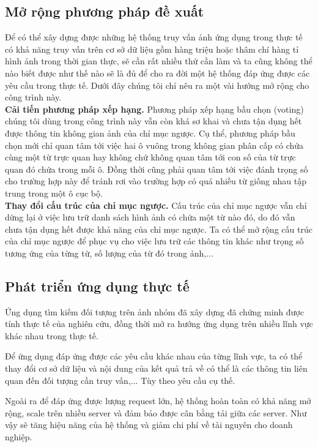 \subsection{Mở rộng phương pháp đề xuất}
Để có thể xây dựng được những hệ thống truy vấn ảnh ứng dụng trong thực tế có khả năng truy vấn trên cơ sở dữ liệu gồm hàng triệu hoặc thâm chí hàng tỉ hình ảnh trong thời gian thực, sẽ cần rất nhiều thứ cần làm và ta cũng không thể nào biết được như thế nào sẽ là đủ để cho ra đời một hệ thống đáp ứng được các yêu cầu trong thực tế. Dưới đây chúng tôi chỉ nêu ra một vài hướng mở rộng cho công trình này.\\
\textbf{Cải tiến phương pháp xếp hạng.} Phương pháp xếp hạng bầu chọn (voting) chúng tôi dùng trong công trình này vẫn còn khá sơ khai và chưa tận dụng hết được thông tin không gian ảnh của chỉ mục ngược. Cụ thể, phương pháp bầu chọn mới chỉ quan tâm tới việc hai ô vuông trong không gian phân cấp có chứa cùng một từ trực quan hay không chứ không quan tâm tới con số của từ trực quan đó chứa trong mỗi ô. Đồng thời cũng phải quan tâm tới việc đánh trọng số cho trường hợp này để tránh rơi vào trường hợp có quá nhiều từ giống nhau tập trung trong một ô cục bộ.\\
\textbf{Thay đổi cấu trúc của chỉ mục ngược.} Cấu trúc của chỉ mục ngược vẫn chỉ dừng lại ở việc lưu trữ danh sách hình ảnh có chứa một từ nào đó, do đó vẫn chưa tận dụng hết được khả năng của chỉ mục ngược. Ta có thể mở rộng cấu trúc của chỉ mục ngược để phục vụ cho việc lưu trữ các thông tin khác như trọng số tương ứng của từng từ, số lượng của từ đó trong ảnh,...


\subsection{Phát triển ứng dụng thực tế}
Ứng dụng tìm kiếm đối tượng trên ảnh nhóm đã xây dựng đã chứng minh được tính thực tế của nghiên cứu, đồng thời mở ra hướng ứng dụng trên nhiều lĩnh vực khác nhau trong thực tế.

Để ứng dụng đáp ứng được các yêu cầu khác nhau của từng lĩnh vực, ta có thể thay đổi cơ sở dữ liệu và nội dung của kết quả trả về có thể là các thông tin liên quan đến đối tượng cần truy vấn,... Tùy theo yêu cầu cụ thế.

Ngoài ra để đáp ứng được lượng request lớn, hệ thống hoàn toàn có khả năng mở rộng, scale trên nhiều server và đảm bảo được cân bằng tải giữa các server. Như vậy sẽ tăng hiệu năng của hệ thống và giảm chi phí về tài nguyên cho doanh nghiệp.




